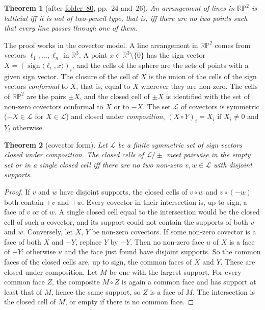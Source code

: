 \documentclass[11pt,a4paper]{amsart}
\newtheorem{theorem}{Theorem}[section]
\theoremstyle{definition}
\theoremstyle{remark}
\newcommand{\PP}{\mathbb{RP}^2}
\newcommand{\fac}[1]{\href{https://grothendieck.umontpellier.fr/#1.pdf}{folder~#1}}
\begin{document}
\begin{theorem}[after \fac{80}, pp.~24 and~26]\label{thm:lattice}
An arrangement of lines in $\PP$ is latticial iff it is not of two-pencil type, that is, iff there are no two points such that every line passes through one of them.
\end{theorem}

The proof works in the covector model. A line arrangement in $\PP$ comes from vectors $\ell_1, \dots, \ell_n$ in $\mathbb R^3$. A point $x \in \mathbb R^3 \setminus \{0\}$ has the sign vector $X = (\operatorname{sign}\langle \ell_i, x\rangle)_i$, and the cells of the sphere are the sets of points with a given sign vector. The closure of the cell of $X$ is the union of the cells of the sign vectors \emph{conformal} to $X$, that is, equal to $X$ wherever they are non-zero. The cells of $\PP$ are the pairs $\pm X$, and the closed cell of $\pm X$ is identified with the set of non-zero covectors conformal to $X$ or to $-X$. The set $\mathcal L$ of covectors is symmetric ($-X \in \mathcal L$ for $X \in \mathcal L$) and closed under \emph{composition}, $(X \circ Y)_i = X_i$ if $X_i \ne 0$ and $Y_i$ otherwise.

\begin{theorem}[covector form]\label{thm:covector}
Let $\mathcal L$ be a finite symmetric set of sign vectors closed under composition. The closed cells of $\mathcal L / \pm$ meet pairwise in the empty set or in a single closed cell iff there are no two non-zero $v, w \in \mathcal L$ with disjoint supports.
\end{theorem}

\begin{proof}
If $v$ and $w$ have disjoint supports, the closed cells of $v \circ w$ and $v \circ (-w)$ both contain $\pm v$ and $\pm w$. Every covector in their intersection is, up to sign, a face of $v$ or of $w$. A single closed cell equal to the intersection would be the closed cell of such a covector, and its support could not contain the supports of both $v$ and $w$. Conversely, let $X$, $Y$ be non-zero covectors. If some non-zero covector is a face of both $X$ and $-Y$, replace $Y$ by $-Y$. Then no non-zero face $u$ of $X$ is a face of $-Y$: otherwise $u$ and the face just found have disjoint supports. So the common faces of the closed cells are, up to sign, the common faces of $X$ and $Y$. These are closed under composition. Let $M$ be one with the largest support. For every common face $Z$, the composite $M \circ Z$ is again a common face and has support at least that of $M$, hence the same support, so $Z$ is a face of $M$. The intersection is the closed cell of $M$, or empty if there is no common face.
\end{proof}
\end{document}
